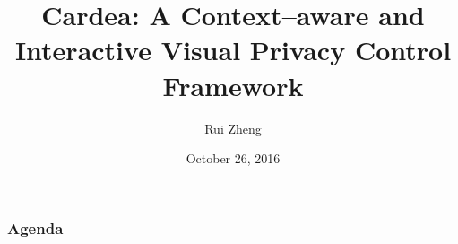 \documentclass{beamer}
\title[Cardea]{Cardea: A Context--aware and Interactive Visual Privacy Control Framework}
\author{Rui Zheng}
\institute[HKUST] %
{
The Hong Kong University of Science and Technology \\ %
\medskip
rzhengac@connect.ust.hk %
}
\date{{\scriptsize October 26, 2016}}
\begin{document}
\begin{frame}
\titlepage
\end{frame}

\begin{frame}
\frametitle{Agenda}
\tableofcontents
\end{frame}











\end{document}
